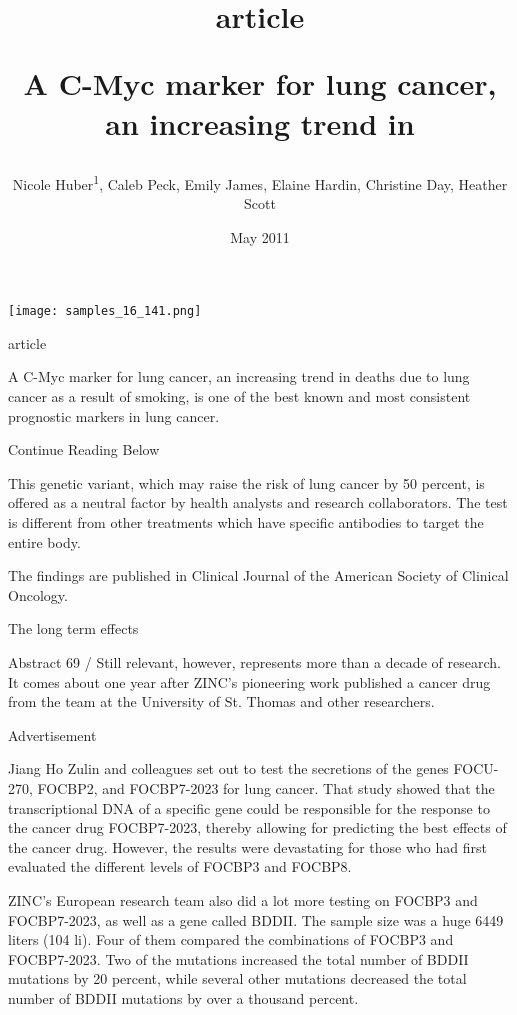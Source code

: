 \documentclass{article}
\title{article

A C-Myc marker for lung cancer, an increasing trend in}
\author{Nicole Huber\textsuperscript{1},  Caleb Peck,  Emily James,  Elaine Hardin,  Christine Day,  Heather Scott}
\affil{\textsuperscript{1}University of California, San Francisco}
\date{May 2011}
\begin{document}
\maketitle

\begin{center}
\begin{minipage}{0.75\linewidth}
\texttt{[image: samples\_16\_141.png]}
\end{minipage}
\end{center}

article

A C-Myc marker for lung cancer, an increasing trend in deaths due to lung cancer as a result of smoking, is one of the best known and most consistent prognostic markers in lung cancer.

Continue Reading Below

This genetic variant, which may raise the risk of lung cancer by 50 percent, is offered as a neutral factor by health analysts and research collaborators. The test is different from other treatments which have specific antibodies to target the entire body.

The findings are published in Clinical Journal of the American Society of Clinical Oncology.

The long term effects

Abstract 69 / Still relevant, however, represents more than a decade of research. It comes about one year after ZINC's pioneering work published a cancer drug from the team at the University of St. Thomas and other researchers.

Advertisement

Jiang Ho Zulin and colleagues set out to test the secretions of the genes FOCU-270, FOCBP2, and FOCBP7-2023 for lung cancer. That study showed that the transcriptional DNA of a specific gene could be responsible for the response to the cancer drug FOCBP7-2023, thereby allowing for predicting the best effects of the cancer drug. However, the results were devastating for those who had first evaluated the different levels of FOCBP3 and FOCBP8.

ZINC's European research team also did a lot more testing on FOCBP3 and FOCBP7-2023, as well as a gene called BDDII. The sample size was a huge 6449 liters (104 li). Four of them compared the combinations of FOCBP3 and FOCBP7-2023. Two of the mutations increased the total number of BDDII mutations by 20 percent, while several other mutations decreased the total number of BDDII mutations by over a thousand percent.
\end{document}
